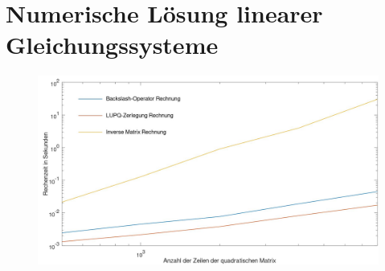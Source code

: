 \section{Numerische Lösung linearer Gleichungssysteme}
\begin{figure}[h]
	\includegraphics[width=.9\textwidth]{data/LaufzeitPlot}
\end{figure}
